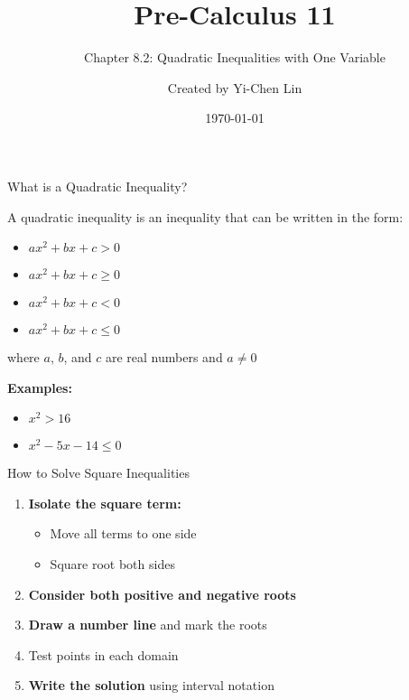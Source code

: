 \documentclass[aspectratio=169]{beamer}
\title{Pre-Calculus 11}
\subtitle{Chapter 8.2: Quadratic Inequalities with One Variable}
\author{Created by Yi-Chen Lin}
\date{\today}
\begin{document}
\begin{frame}
    \titlepage
\end{frame}

\begin{frame}{What is a Quadratic Inequality?}
    \begin{tcolorbox}[colback=lightgray,colframe=primary,title=Definition]
        \footnotesize
        A quadratic inequality is an inequality that can be written in the form:
        \begin{itemize}
            \item $ax^2 + bx + c > 0$
            \item $ax^2 + bx + c \geq 0$
            \item $ax^2 + bx + c < 0$
            \item $ax^2 + bx + c \leq 0$
        \end{itemize}
        where $a$, $b$, and $c$ are real numbers and $a \neq 0$
    \end{tcolorbox}
    \vspace{0.5em}
    \textbf{Examples:}
    \begin{itemize}
        \item $x^2 > 16$
        \item $x^2 - 5x - 14 \leq 0$
    \end{itemize}
\end{frame}

\begin{frame}{How to Solve Square Inequalities}
    \begin{tcolorbox}[colback=lightgray,colframe=primary,title=Step-by-Step Method]
        \footnotesize
        \begin{enumerate}
            \item \textcolor{accent}{\textbf{Isolate the square term:}}
            \begin{itemize}
                \item Move all terms to one side
                \item Square root both sides
            \end{itemize}
            \item \textcolor{accent}{\textbf{Consider both positive and negative roots}}
            \item \textcolor{accent}{\textbf{Draw a number line}} and mark the roots
            \item Test points in each domain
            \item \textcolor{accent}{\textbf{Write the solution}} using interval notation
        \end{enumerate}
    \end{tcolorbox}
\end{frame}
\end{document}
